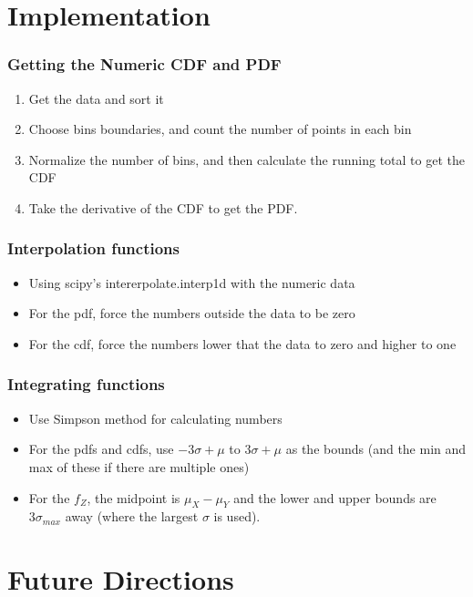 \documentclass{beamer}
\begin{document}
\section{Implementation}

\begin{frame}
  \frametitle{Getting the Numeric CDF and PDF}
  \begin{enumerate}
  \item Get the data and sort it
  \item Choose bins boundaries, and count the number of points in each bin
  \item Normalize the number of bins, and then calculate the running total to get the CDF
  \item Take the derivative of the CDF to get the PDF.
  \end{enumerate}
\end{frame}

\begin{frame}
  \frametitle{Interpolation functions}
  \begin{itemize}
  \item Using scipy's intererpolate.interp1d with the numeric data
  \item For the pdf, force the numbers outside the data to be zero
  \item For the cdf, force the numbers lower that the data to zero and higher to one
  \end{itemize}
\end{frame}

\begin{frame}
  \frametitle{Integrating functions}
  \begin{itemize}
  \item Use Simpson method for calculating numbers
  \item For the pdfs and cdfs, use $-3\sigma+\mu$ to $3\sigma+\mu$ as
    the bounds (and the min and max of these if there are multiple
    ones)
  \item For the $f_Z$, the midpoint is $\mu_X-\mu_Y$ and the lower and
    upper bounds are $3\sigma_{max}$ away (where the largest $\sigma$
    is used).
  \end{itemize}
\end{frame}

\section{Future Directions}
\end{document}
